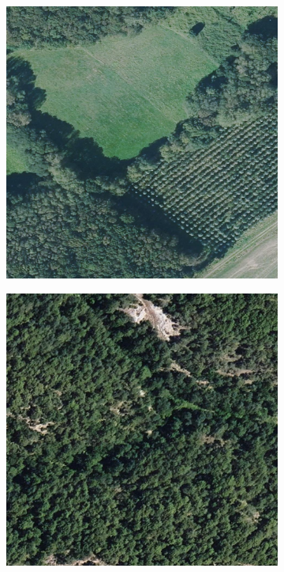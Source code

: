 \begin{figure}[H]
    \centering
    
    \begin{subfigure}[b]{0.31\textwidth}
        \includegraphics[width=\linewidth]{15_1903_1997.0.jpg}
        \label{fig:orto1}
    \end{subfigure}
    \hfill
    \begin{subfigure}[b]{0.31\textwidth}
        \includegraphics[width=\linewidth]{25_2209_2001.0.jpg}

\end{subfigure}
\end{figure}
